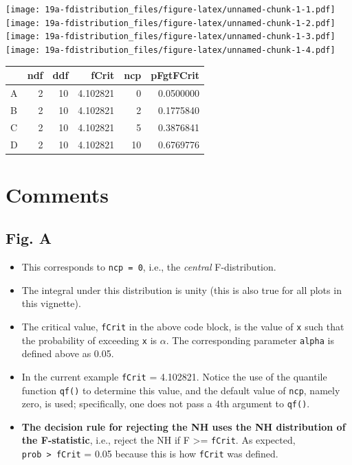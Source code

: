 \documentclass[
]{book}
\providecommand{\tightlist}{%
  \setlength{\itemsep}{0pt}\setlength{\parskip}{0pt}}
\begin{document}
\texttt{[image: 19a-fdistribution\_files/figure-latex/unnamed-chunk-1-1.pdf]} \texttt{[image: 19a-fdistribution\_files/figure-latex/unnamed-chunk-1-2.pdf]} \texttt{[image: 19a-fdistribution\_files/figure-latex/unnamed-chunk-1-3.pdf]} \texttt{[image: 19a-fdistribution\_files/figure-latex/unnamed-chunk-1-4.pdf]}

\begin{tabular}{l|r|r|r|r|r}
\hline
  & ndf & ddf & fCrit & ncp & pFgtFCrit\\
\hline
A & 2 & 10 & 4.102821 & 0 & 0.0500000\\
\hline
B & 2 & 10 & 4.102821 & 2 & 0.1775840\\
\hline
C & 2 & 10 & 4.102821 & 5 & 0.3876841\\
\hline
D & 2 & 10 & 4.102821 & 10 & 0.6769776\\
\hline
\end{tabular}

\hypertarget{comments}{%
\section{Comments}\label{comments}}

\hypertarget{fig.-a}{%
\subsection{Fig. A}\label{fig.-a}}

\begin{itemize}
\tightlist
\item
  This corresponds to \texttt{ncp\ =\ 0}, i.e., the \emph{central} F-distribution.
\item
  The integral under this distribution is unity (this is also true for all plots in this vignette).
\item
  The critical value, \texttt{fCrit} in the above code block, is the value of \texttt{x} such that the probability of exceeding \texttt{x} is \(\alpha\). The corresponding parameter \texttt{alpha} is defined above as 0.05.
\item
  In the current example \texttt{fCrit} = 4.102821. Notice the use of the quantile function \texttt{qf()} to determine this value, and the default value of \texttt{ncp}, namely zero, is used; specifically, one does not pass a 4th argument to \texttt{qf()}.
\item
  \textbf{The decision rule for rejecting the NH uses the NH distribution of the F-statistic}, i.e., reject the NH if F \textgreater= \texttt{fCrit}. As expected, \texttt{prob\ \textgreater{}\ fCrit} = 0.05 because this is how \texttt{fCrit} was defined.
\end{itemize}
\end{document}
